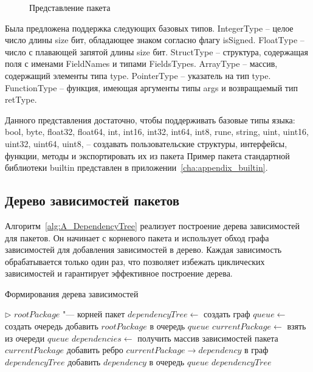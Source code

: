 \begin{figure}[h]
    \centering

    

    \caption{Представление пакета}
    \label{fig:package-pres}
\end{figure}


Была предложена поддержка следующих базовых типов.
IntegerType -- целое число длины size бит, обладающее знаком согласно флагу isSigned.
FloatType -- число с плавающей запятой длины size бит.
StructType -- структура, содержащая поля с именами FieldNames и типами FieldsTypes.
ArrayType -- массив, содержащий элементы типа type.
PointerType -- указатель на тип type.
FunctionType -- функция, имеющая аргументы типы args и возвращаемый тип retType.

Данного представления достаточно, чтобы поддерживать базовые типы языка: bool, byte, float32, float64, int, int16, int32, int64, int8, rune, string, uint, uint16, uint32, uint64, uint8, -- создавать пользовательские структуры, интерфейсы, функции, методы и экспортировать их из пакета
Пример пакета стандартной библиотеки builtin представлен в приложении~\ref{cha:appendix_builtin}.

\subsection*{Дерево зависимостей пакетов}


Алгоритм~\ref{alg:A_DependencyTree} реализует построение дерева зависимостей для пакетов.
Он начинает с корневого пакета и использует обход графа зависимостей для добавления зависимостей в дерево.
Каждая зависимость обрабатывается только один раз, что позволяет избежать циклических зависимостей и гарантирует эффективное построение дерева.

\begin{breakablealgorithm}
    \caption{Формирования дерева зависимостей}
    \label{alg:A_DependencyTree}

    \begin{algorithmic}[1]
            \Statex $\triangleright$ $rootPackage$ "--- корней пакет
            \Statex
            \State $dependencyTree \leftarrow$ создать граф
            \State $queue \leftarrow$ создать очередь
            \State добавить $rootPackage$ в очередь $queue$
                \State $currentPackage \leftarrow$ взять из очереди $queue$
                \State $dependencies \leftarrow$ получить массив зависимостей пакета $currentPackage$
                    \State добавить ребро $currentPackage \rightarrow dependency$ в граф $dependencyTree$
                        \State добавить $dependency$ в очередь $queue$
                    \EndIf
                \EndFor
            \EndWhile
            \State \Return $dependencyTree$
        \EndFunction
    \end{algorithmic}
\end{breakablealgorithm}



